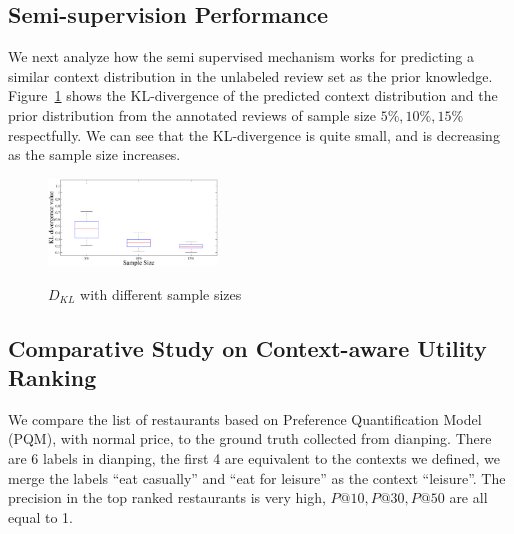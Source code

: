 \documentclass[preprint,12pt]{elsarticle}
\begin{document}
\subsection{Semi-supervision Performance}
We next analyze how the semi supervised mechanism works for predicting a similar context distribution in the unlabeled review set as the prior knowledge. Figure~\ref{fig:KL} shows the KL-divergence of the predicted context distribution and the prior distribution from the annotated reviews of sample size $5\%,10\%,15\%$ respectfully. We can see that the KL-divergence is quite small, and is decreasing as the sample size increases.
\begin{figure}
\centering
\includegraphics[width=0.4\textwidth]{KL.eps}\label{fig:KL}
\caption{$D_{KL}$ with different sample sizes}
\end{figure}

\subsection{Comparative Study on Context-aware Utility Ranking}
We compare the list of restaurants based on Preference Quantification Model (PQM), with normal price, to the ground truth collected from dianping. There are 6 labels in dianping, the first 4 are equivalent to the contexts we defined, we merge the labels ``eat casually'' and ``eat for leisure'' as the context ``leisure''. The precision in the top ranked restaurants is very high, $P@10,P@30,P@50$ are all equal to 1.
\end{document}
